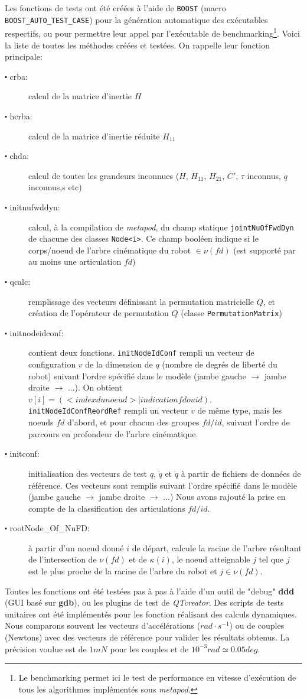 \documentclass{report}
\begin{document}
Les fonctions de tests ont été créées à l'aide de \verb;BOOST; (macro \verb;BOOST_AUTO_TEST_CASE;) pour la génération automatique des exécutables respectifs, ou pour permettre leur appel par l'exécutable de benchmarking\footnote{Le benchmarking permet ici le test de performance en vitesse d'exécution de tous les algorithmes implémentés sous \emph{metapod}.}.
Voici la liste de toutes les méthodes créées et testées. On rappelle leur fonction principale:
\begin{description}
\item[$\centerdot$ crba:] calcul de la matrice d'inertie $H$
\item[$\centerdot$ hcrba:] calcul de la matrice d'inertie réduite $H_{11}$
\item[$\centerdot$ chda:] calcul de toutes les grandeurs inconnues ($H$, $H_{11}$, $H_{21}$, $C'$, $\tau$ inconnus, $\ddot{q}$ inconnus,s etc)
\item[$\centerdot$ initnufwddyn:] calcul, à la compilation de \emph{metapod}, du champ statique \verb;jointNuOfFwdDyn; de chacune des classes \verb;Node<i>;. Ce champ booléen indique si le corps/noeud de l'arbre cinématique du robot $\in \nu(fd)$ (est supporté par au moins une articulation $fd$)
\item[$\centerdot$ qcalc:] remplissage des vecteurs définissant la permutation matricielle $Q$, et création de l'opérateur de permutation $Q$ (classe \verb;PermutationMatrix;)
\item[$\centerdot$ initnodeidconf:] contient deux fonctions. \verb;initNodeIdConf; rempli un vecteur de configuration $v$ de la dimension de $q$ (nombre de degrés de liberté du robot) suivant l'ordre spécifié dans le modèle (jambe gauche $\rightarrow$ jambe droite $\rightarrow$ ...). On obtient $v[i]=( <index du noeud> | indication fd ou id )$. \verb;initNodeIdConfReordRef; rempli un vecteur $v$ de même type, mais les noeuds $fd$ d'abord, et pour chacun des groupes $fd/id$, suivant l'ordre de parcours en profondeur de l'arbre cinématique.
\item[$\centerdot$ initconf:] initialisation des vecteurs de test $q$, $\dot{q}$ et $\ddot{q}$ à partir de fichiers de données de référence.  Ces vecteurs sont remplis suivant l'ordre spécifié dans le modèle (jambe gauche $\rightarrow$ jambe droite $\rightarrow$ ...) Nous avons rajouté la prise en compte de la classification des articulations $fd/id$.
\item[$\centerdot$ rootNode\_Of\_NuFD:] à partir d'un noeud donné $i$ de départ, calcule la racine de l'arbre résultant de l'intersection de $\nu(fd)$ et de $\kappa(i)$, \cad le noeud atteignable $j$ tel que $j$ est le plus proche de la racine de l'arbre du robot et $j \in \nu(fd)$.
\end{description}
\noindent
Toutes les fonctions ont été testées pas à pas à l'aide d'un outil de "debug" \textbf{ddd} (GUI basé sur \textbf{gdb}), ou les plugins de test de \emph{QTcreator}. Des scripts de tests unitaires ont été implémentés pour les fonction réalisant des calculs dynamiques. Nous comparons souvent les vecteurs d'accélérations ($rad \cdot s^{-1}$) ou de couples (Newtons) avec des vecteurs de référence pour valider les résultats obtenus. La précision voulue est de $1 mN$ pour les couples et de $10^{-3} rad \simeq 0.05 deg$.
\end{document}
